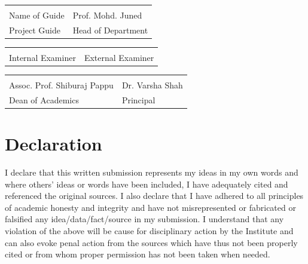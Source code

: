 \documentclass[12pt,a4paper,twoside,openright]{report}
\begin{document}
	\vspace{1.5cm}
	\begin{flushleft}
	\begin{tabular}{p{10cm} p{10cm}}
		\underline{\hspace{5cm}} & \underline{\hspace{5cm}} \\
		Name of Guide & Prof. Mohd. Juned \\
		Project Guide & Head of Department \\
	\end{tabular}
	
	\vspace{1.5cm}
	\begin{tabular}{p{10cm} p{10cm}}
		\underline{\hspace{5cm}} & \underline{\hspace{5cm}} \\
		Internal Examiner & External Examiner \\
	\end{tabular}
	
	
	\vspace{1.5cm}
	\begin{tabular}{p{10cm} p{10cm}}
		\underline{\hspace{5cm}} & \underline{\hspace{5cm}} \\
		Assoc. Prof. Shiburaj Pappu & Dr. Varsha Shah \\
		Dean of Academics & Principal \\
	\end{tabular}

	\end{flushleft}
	\vspace*{\fill}
	
	
	
	
	\chapter*{Declaration}
	I declare that this written submission represents my ideas in my own words and where others' ideas or words have been included, I have adequately cited and referenced the original sources. I also declare that I have adhered to all principles of academic honesty and integrity and have not misrepresented or fabricated or falsified any idea/data/fact/source in my submission. I understand that any violation of the above will be cause for disciplinary action by the Institute and can also evoke penal action from the sources which have thus not been properly cited or from whom proper permission has not been taken when needed.
	
\end{document}

